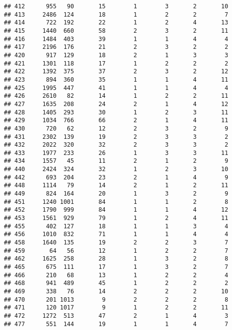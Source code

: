 \documentclass[]{article}
\begin{document}
\begin{verbatim}
## 412      955   90       15        1        3       2       10
## 413     2486  124       18        1        2       2        7
## 414      722  192       22        1        2       4       13
## 415     1440  660       58        2        3       2       11
## 416     1484  403       39        1        1       4        4
## 417     2196  176       21        2        3       2        2
## 420      917  129       18        2        1       3        3
## 421     1301  118       17        1        2       2        2
## 422     1392  375       37        2        3       2       12
## 423      894  360       35        1        1       4       11
## 425     1995  447       41        1        1       4        4
## 426     2610   82       14        1        2       2       11
## 427     1635  208       24        2        1       4       12
## 428     1405  293       30        1        2       3       11
## 429     1034  766       66        2        1       4       11
## 430      720   62       12        2        3       2        9
## 431     2302  139       19        2        3       3        2
## 432     2022  320       32        2        3       3        2
## 433     1977  233       26        1        3       3       11
## 434     1557   45       11        2        1       2        9
## 440     2424  324       32        1        2       3       10
## 442      693  204       23        2        1       4        9
## 448     1114   79       14        2        1       2       11
## 449      824  164       20        1        3       2        9
## 451     1240 1001       84        1        1       2        8
## 452     1790  999       84        1        1       4       12
## 453     1561  929       79        1        2       4       11
## 455      402  127       18        1        1       3        4
## 456     1010  832       71        1        1       4        4
## 458     1640  135       19        2        2       3        7
## 459       64   56       12        1        2       2        7
## 462     1625  258       28        1        3       2        8
## 465      675  111       17        1        3       2        7
## 466      210   68       13        1        2       2        4
## 468      941  489       45        1        2       2        2
## 469      338   76       14        2        2       2       10
## 470      201 1013        9        2        2       2        8
## 471      120 1017        9        1        2       2       11
## 472     1272  513       47        2        1       4        3
## 477      551  144       19        1        1       4        7

\end{verbatim}
\end{document}
